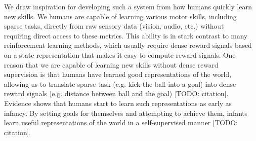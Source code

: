 We draw inspiration for developing such a system from how humans quickly learn new skills.
We humans are capable of learning various motor skills, including sparse tasks, directly from raw sensory data (vision, audio, etc.) without requiring direct access to these metrics.
This ability is in stark contrast to many reinforcement learning methods, which usually require dense reward signals based on a state representation that makes it easy to compute reward signals.
One reason that we are capable of learning new skills without dense reward supervision is that humans have learned good representations of the world, allowing us to translate sparse task (e.g. kick the ball into a goal) into dense reward signals (e.g. distance between ball and the goal) [TODO: citation].
Evidence shows that humans start to learn such representations as early as infancy.
By setting goals for themselves and attempting to achieve them, infants learn useful representations of the world in a self-supervised manner [TODO: citation].

